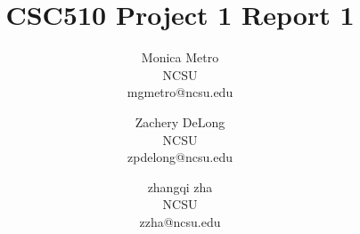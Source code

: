\documentclass{article}
\begin{document}
\title{CSC510 Project 1 Report 1}
\date{} %

\author{{\large Monica Metro}\\NCSU\\mgmetro@ncsu.edu \and {\large Zachery DeLong}\\NCSU\\zpdelong@ncsu.edu \and {\large zhangqi zha}\\NCSU\\zzha@ncsu.edu }

\maketitle
















\end{document}
